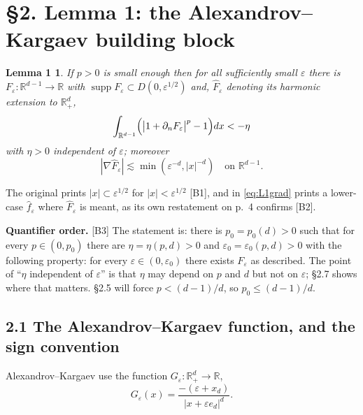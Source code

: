 \documentclass[11pt,reqno]{amsart}
\theoremstyle{plain}
\newtheorem*{lemA}{Lemma 1}
\theoremstyle{definition}
\theoremstyle{plain}
\theoremstyle{definition}
\theoremstyle{remark}
\newcommand{\Rd}{\mathbb{R}^d_+}
\newcommand{\Rdm}{\mathbb{R}^{d-1}}
\newcommand{\nd}{\partial_n}
\newcommand{\he}[1]{\widehat{#1}}
\newcommand{\Ftil}{\widehat{F}_\varepsilon}
\DeclareMathOperator{\supp}{supp}
\newcommand{\Ledger}[1]{{\scriptsize\textsf{[#1]}}}
\begin{document}
\section*{\S2. Lemma 1: the Alexandrov--Kargaev building block}

\begin{lemA}
If $p>0$ is small enough then for all sufficiently small $\varepsilon$ there is
$F_\varepsilon:\Rdm\to\mathbb R$ with
$\supp F_\varepsilon\subset D(0,\varepsilon^{1/2})$ and, $\Ftil$ denoting its
harmonic extension to $\Rd$,
\begin{equation}\label{eq:L1main}
  \int_{\Rdm}\Bigl(\bigl|1+\nd F_\varepsilon\bigr|^p-1\Bigr)dx<-\eta
\end{equation}
with $\eta>0$ independent of $\varepsilon$; moreover
\begin{equation}\label{eq:L1grad}
  |\nabla\Ftil|\lesssim\min(\varepsilon^{-d},|x|^{-d})\quad\text{on }\Rdm .
\end{equation}
\end{lemA}

\begin{ournotation}
The original prints $|x|\subset\varepsilon^{1/2}$ for $|x|<\varepsilon^{1/2}$
\Ledger{B1}, and in \eqref{eq:L1grad} prints a lower-case $\he f_\varepsilon$ where
$\Ftil$ is meant, as its own restatement on p.~4 confirms \Ledger{B2}.
\end{ournotation}

\begin{filled}
\textbf{Quantifier order.} \Ledger{B3} The statement is: there is $p_0=p_0(d)>0$
such that for every $p\in(0,p_0)$ there are $\eta=\eta(p,d)>0$ and
$\varepsilon_0=\varepsilon_0(p,d)>0$ with the following property: for every
$\varepsilon\in(0,\varepsilon_0)$ there exists $F_\varepsilon$ as described. The
point of ``$\eta$ independent of $\varepsilon$'' is that $\eta$ may depend on $p$
and $d$ but not on $\varepsilon$; \S2.7 shows where that matters. \S2.5 will force
$p<(d-1)/d$, so $p_0\le(d-1)/d$.
\end{filled}

\subsection*{2.1 The Alexandrov--Kargaev function, and the sign convention}

Alexandrov--Kargaev use the function $G_\varepsilon:\Rd\to\mathbb R$,
\begin{equation}\label{eq:G}
  G_\varepsilon(x)=\frac{-(\varepsilon+x_d)}{|x+\varepsilon e_d|^{d}} .
\end{equation}
\end{document}
